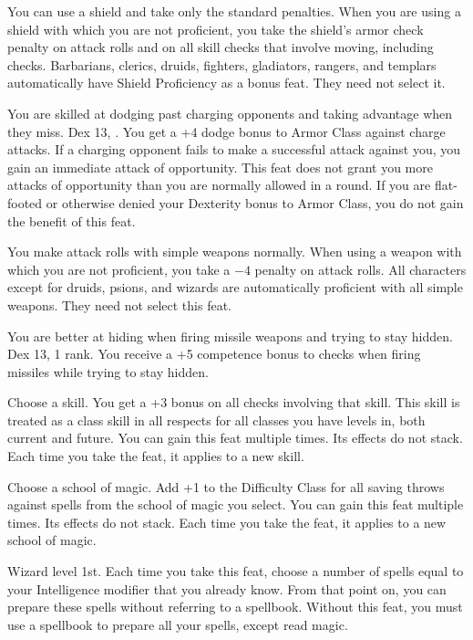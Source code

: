 {}{}
{You can use a shield and take only the standard penalties.}
{When you are using a shield with which you are not proficient, you take the shield's armor check penalty on attack rolls and on all skill checks that involve moving, including  checks.}
{Barbarians, clerics, druids, fighters, gladiators, rangers, and templars automatically have Shield Proficiency as a bonus feat. They need not select it.}

{You are skilled at dodging past charging opponents and taking advantage when they miss.}
{Dex 13, .}
{You get a +4 dodge bonus to Armor Class against charge attacks. If a charging opponent fails to make a successful attack against you, you gain an immediate attack of opportunity. This feat does not grant you more attacks of opportunity than you are normally allowed in a round. If you are flat-footed or otherwise denied your Dexterity bonus to Armor Class, you do not gain the benefit of this feat.}{}{}

{}{}
{You make attack rolls with simple weapons normally.}
{When using a weapon with which you are not proficient, you take a $-4$ penalty on attack rolls.}
{All characters except for druids, psions, and wizards are automatically proficient with all simple weapons. They need not select this feat.}

{You are better at hiding when firing missile weapons and trying to stay hidden.}
{Dex 13,  1 rank.}
{You receive a +5 competence bonus to  checks when firing missiles while trying to stay hidden.}{}{}

{Choose a skill.}{}
{You get a +3 bonus on all checks involving that skill. This skill is treated as a class skill in all respects for all classes you have levels in, both current and future.}{}
{You can gain this feat multiple times. Its effects do not stack. Each time you take the feat, it applies to a new skill.}

{Choose a school of magic.}{}
{Add +1 to the Difficulty Class for all saving throws against spells from the school of magic you select.}{}
{You can gain this feat multiple times. Its effects do not stack. Each time you take the feat, it applies to a new school of magic.}

{Wizard level 1st.}
{Each time you take this feat, choose a number of spells equal to your Intelligence modifier that you already know. From that point on, you can prepare these spells without referring to a spellbook.}
{Without this feat, you must use a spellbook to prepare all your spells, except read magic.}{}

